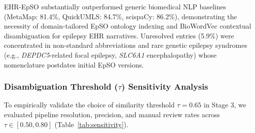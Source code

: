 \documentclass[11pt,a4paper]{article}
\begin{document}
\begin{table}[h!]
\centering
\caption{\textbf{EpSO Ontology Alignment Performance across Clinical Entry Sources and Comparison against Standard Biomedical NLP Tools.} CR = Concept Resolution Rate; MCS = Mean Cosine Similarity (mean $\pm$ SD).}
\label{tab:nlp_performance}
\end{table}

EHR-EpSO substantially outperformed generic biomedical NLP baselines (MetaMap: 81.4\%, QuickUMLS: 84.7\%, scispaCy: 86.2\%), demonstrating the necessity of domain-tailored EpSO ontology indexing and BioWordVec contextual disambiguation for epilepsy EHR narratives. Unresolved entries (5.9\%) were concentrated in non-standard abbreviations and rare genetic epilepsy syndromes (e.g., \textit{DEPDC5}-related focal epilepsy, \textit{SLC6A1} encephalopathy) whose nomenclature postdates initial EpSO versions.

\subsubsection{Disambiguation Threshold ($\tau$) Sensitivity Analysis}
To empirically validate the choice of similarity threshold $\tau = 0.65$ in Stage 3, we evaluated pipeline resolution, precision, and manual review rates across $\tau \in [0.50, 0.80]$ (Table~\ref{tab:sensitivity}).
\end{document}
